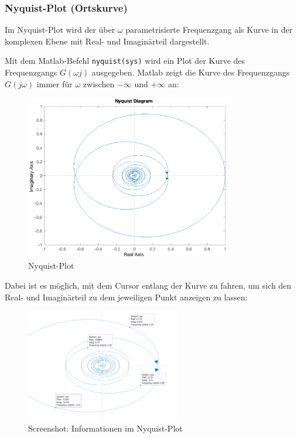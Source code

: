 \subsubsection{Nyquist-Plot (Ortskurve)}
Im Nyquist-Plot wird der über $\omega$ parametrisierte Frequenzgang als Kurve in der komplexen Ebene mit Real- und Imaginärteil dargestellt.

Mit dem Matlab-Befehl \texttt{nyquist(sys)} wird ein Plot der Kurve des Frequenzgangs $G(\omega j)$ ausgegeben. 
Matlab zeigt die Kurve des Frequenzgangs $G(j\omega)$ immer für $\omega$ zwischen $- \infty$ und $+ \infty$ an:

\begin{figure}[H]
    \label{fig:nyquist}
    \centering
    \includegraphics[width=0.8\textwidth]{Bilder/NyquistPT1Tt.eps}
    \caption{Nyquist-Plot}
 \end{figure}

 Dabei ist es möglich, mit dem Cursor entlang der Kurve zu fahren, um sich den Real- und Imaginärteil zu dem jeweiligen Punkt anzeigen zu lassen:
 \begin{figure}[H]
    \label{fig:nyquistCursor}
    \centering
    \includegraphics[width=0.6\textwidth]{Bilder/NyquistCursorPT1Tt.png}
    \caption{Screenshot: Informationen im Nyquist-Plot}
 \end{figure}

